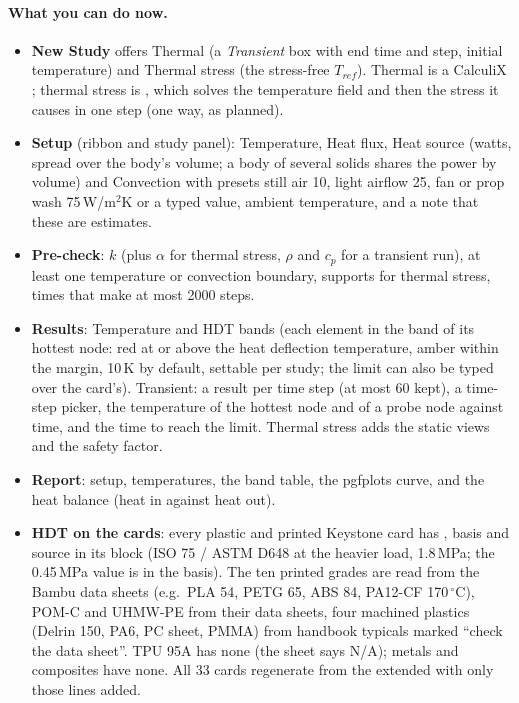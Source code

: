 \paragraph{What you can do now.}
\begin{itemize}[nosep]
  \item \textbf{New Study} offers Thermal (a \emph{Transient} box with end time and step, initial temperature) and
        Thermal stress (the stress-free $T_{ref}$). Thermal is a CalculiX ; thermal stress is
        , which solves the temperature field and then the stress it
        causes in one step (one way, as planned).
  \item \textbf{Setup} (ribbon and study panel): Temperature, Heat flux, Heat source (watts, spread over the body's volume;
        a body of several solids shares the power by volume) and Convection with presets still air 10, light airflow 25,
        fan or prop wash 75\,W/m$^2$K or a typed value, ambient temperature, and a note that these are estimates.
  \item \textbf{Pre-check}: $k$ (plus $\alpha$ for thermal stress, $\rho$ and $c_p$ for a transient run), at least one
        temperature or convection boundary, supports for thermal stress, times that make at most 2000 steps.
  \item \textbf{Results}: Temperature and HDT bands (each element in the band of its hottest node: red at or above the heat
        deflection temperature, amber within the margin, 10\,K by default, settable per study; the limit can also be typed
        over the card's). Transient: a result per time step (at most 60 kept), a time-step picker, the temperature of the
        hottest node and of a probe node against time, and the time to reach the limit. Thermal stress adds the static views
        and the safety factor.
  \item \textbf{Report}: setup, temperatures, the band table, the pgfplots curve, and the heat balance (heat in against heat out).
  \item \textbf{HDT on the cards}: every plastic and printed Keystone card has , basis and
        source in its  block (ISO 75 / ASTM D648 at the heavier load, 1.8\,MPa; the 0.45\,MPa value is in the
        basis). The ten printed grades are read from the Bambu data sheets (e.g.\ PLA 54, PETG 65, ABS 84, PA12-CF 170\,$^\circ$C),
        POM-C and UHMW-PE from their data sheets, four machined plastics (Delrin 150, PA6, PC sheet, PMMA) from handbook
        typicals marked ``check the data sheet''. TPU 95A has none (the sheet says N/A); metals and composites have none.
        All 33 cards regenerate from the extended  with only those lines added.
\end{itemize}

